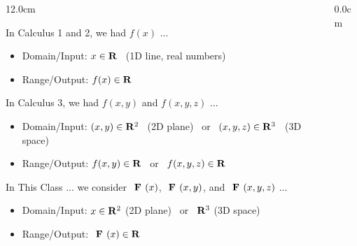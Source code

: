 \begin{frame}
\begin{columns}
\begin{column}{12.0cm}
\vspace{0.3cm}

In Calculus 1 and 2, we had $f(x)$ ...

\begin{itemize}
	\item Domain/Input: \quad $x \in \mathbf{R}$ \, (1D line, real numbers)
	\item Range/Output: \quad $f(x) \in \mathbf{R}$
\end{itemize}

\vspace{0.1cm}

In Calculus 3, we had $f(x,y)$ and $f(x,y,z)$ ... 

\begin{itemize}
	\item Domain/Input: \quad $(x,y) \in \mathbf{R}^2$ \, (2D plane) \, or \, $(x,y,z) \in \mathbf{R}^3$ \, (3D space)
	\item Range/Output: \quad $f(x,y) \in \mathbf{R}$ \, or \, $f(x,y,z) \in \mathbf{R}$
\end{itemize}

\vspace{0.1cm}

In This Class ... we consider $\textbf{ F }(x)$, $\textbf{ F }(x,y)$, and $\textbf{ F }(x,y,z)$ ... 

\begin{itemize}
	\item Domain/Input: \quad $x \in \mathbf{R}^2$ (2D plane) \, or \, $\mathbf{R}^3$ (3D space)
	\item Range/Output: \quad $\textbf{ F }(x) \in \mathbf{R}$
\end{itemize}

\end{column}
\begin{column}{0.0cm}\end{column}
\end{columns}
\end{frame}

